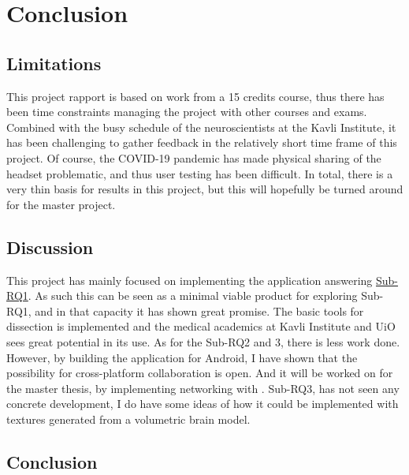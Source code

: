 \chapter{Conclusion}




\section{Limitations}

This project rapport is based on work from a 15 credits course, thus there has been time constraints managing the project with other courses and exams. Combined with the busy schedule of the neuroscientists at the Kavli Institute, it has been challenging to gather feedback in the relatively short time frame of this project.
Of course, the COVID-19 pandemic has made physical sharing of the headset problematic, and thus user testing has been difficult. 
In total, there is a very thin basis for results in this project, but this will hopefully be turned around for the master project.


\section{Discussion}



This project has mainly focused on implementing the application answering \href{subrq1}{Sub-RQ1}. As such this can be seen as a minimal viable product for exploring Sub-RQ1, and in that capacity it has shown great promise. The basic tools for dissection is implemented and the medical academics at Kavli Institute and UiO sees great potential in its use. 
As for the Sub-RQ2 and 3, there is less work done. However, by building the application for Android, I have shown that the possibility for cross-platform collaboration is open. And it will be worked on for the master thesis, by implementing networking with . Sub-RQ3, has not seen any concrete development, I do have some ideas of how it could be implemented with textures generated from a volumetric brain model. 


\section{Conclusion}

